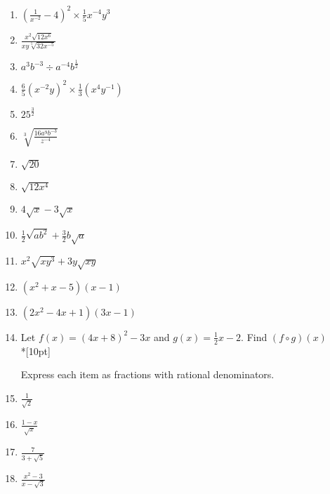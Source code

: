 \documentclass[]{book}
\begin{document}
\begin{enumerate}
\begin{figure}[!htbp]
\begin{center}
\end{center}
\end{figure}


\newpage

\item $\displaystyle (\frac{1}{x^{-2}}-4)^2 \times \frac{1}{5}x^{-4} y^{3}$
\item $\displaystyle  \frac{x^2 \sqrt{12x^6}}{xy \sqrt[5]{32x^{-5}}}$
\item $a^3 b^{-3} \div a^{-4} b^{\frac{1}{2}}$
\item $\displaystyle \frac{6}{5} (x^{-2} y)^2 \times \frac{1}{3}(x^4 y^{-1})$
\item $\displaystyle  25^\frac{3}{2}$
\item $\displaystyle  \sqrt[3]{\frac{16a^9 b^{-3}}{z^{-4}}}$

\item $\sqrt{20}$
\item $\sqrt{12x^4}$

\item $4\sqrt{x}-3\sqrt{x}$
\item $\frac{1}{2}\sqrt{ab^2}+\frac{3}{2}b\sqrt{a}$
\item $x^2 \sqrt{xy^3}+3y\sqrt{xy}$

\item $(x^2+x-5)(x-1)$
\item $(2x^2-4x+1)(3x-1)$

\item Let $f(x) = (4x+8)^2 - 3x$ and $g(x)=\frac{1}{2}x-2$. Find $(f \circ g) (x)$\\*[10pt]

Express each item as fractions with rational denominators.
\item $\displaystyle   \frac{1}{\sqrt{2}}$
\item $\displaystyle  \frac{1-x}{\sqrt{x}}$
\item $\displaystyle  \frac{7}{3+\sqrt{5}}$
\item $\displaystyle  \frac{x^2-3}{x-\sqrt{3}}$

\newpage 


\end{enumerate}
\end{document}
